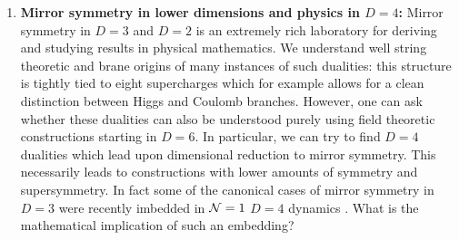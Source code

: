 \documentclass[12pt]{article}
\begin{document}
\begin{enumerate}
 \item  {\bf Mirror symmetry in lower dimensions and physics in $D=4$:} Mirror symmetry in $D=3$ and $D=2$ is an extremely rich laboratory for deriving and studying results in physical mathematics. We understand well string theoretic and brane origins of many instances of such dualities: this structure is tightly tied to eight supercharges which for example allows for a clean distinction between Higgs and Coulomb branches. However, one can ask whether these dualities can also be understood purely using field theoretic constructions starting in $D=6$. In particular, we can try to find $D=4$ dualities which lead upon dimensional reduction to mirror symmetry. This necessarily leads to constructions with lower amounts of symmetry and supersymmetry. In fact some of the canonical cases of mirror symmetry in $D=3$  were recently imbedded in ${\cal N}=1$ $D=4$ dynamics \cite{Pasquetti:2019hxf,Hwang:2020wpd,Bottini:2021vms}. What is the mathematical implication of such an embedding?  



\end{enumerate}
\end{document}
